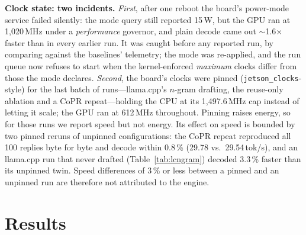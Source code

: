 \documentclass[lettersize,journal]{IEEEtran}
\newcommand{\sys}{CoPR}
\newcommand{\lc}{llama.cpp}
\begin{document}
\textbf{Clock state: two incidents.} \emph{First}, after one reboot the
board's power-mode service failed silently: the mode query still reported
15\,W, but the GPU ran at 1{,}020\,MHz under a \emph{performance} governor, and
plain decode came out $\sim$1.6$\times$ faster than in every earlier run. It
was caught before any reported run, by comparing against the baselines'
telemetry; the mode was re-applied, and the run queue now refuses to start when
the kernel-enforced \emph{maximum} clocks differ from those the mode declares.
\emph{Second}, the board's clocks were pinned (\texttt{jetson\_clocks}-style)
for the last batch of runs---\lc{}'s $n$-gram drafting, the reuse-only ablation
and a \sys{} repeat---holding the CPU at its 1{,}497.6\,MHz cap instead of
letting it scale; the GPU ran at 612\,MHz throughout. Pinning raises energy, so
for those runs we report speed but not energy. Its effect on speed is bounded by
two pinned reruns of unpinned configurations: the \sys{} repeat reproduced all
100 replies byte for byte and decode within 0.8\,\% (29.78 vs.\ 29.54\,tok/s),
and an \lc{} run that never drafted (Table~\ref{tab:lcngram}) decoded 3.3\,\%
faster than its unpinned twin. Speed differences of 3\,\% or less between a
pinned and an unpinned run are therefore not attributed to the engine.

\section{Results}\label{sec:results}
\end{document}

